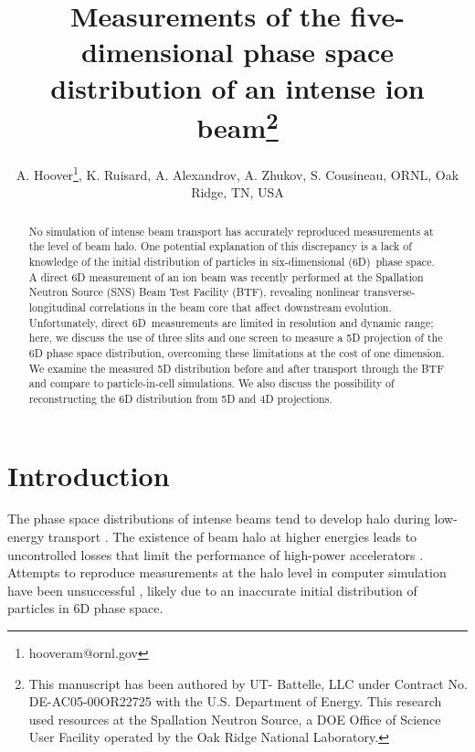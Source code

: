 \documentclass[letterpaper,
               nospread,
               biblatex,
              ]{jacow}
\begin{document}
\title{Measurements of the five-dimensional phase space\\ distribution of an intense ion beam\thanks{This manuscript has been authored by UT- Battelle, LLC under Contract No. DE-AC05-00OR22725 with the U.S. Department of Energy. This research used resources at the Spallation Neutron Source, a DOE Office of Science User Facility operated by the Oak Ridge National Laboratory.}}

\author{A. Hoover\thanks{hooveram@ornl.gov}, K. Ruisard, A. Alexandrov, A. Zhukov, S. Cousineau, ORNL, Oak Ridge, TN, USA}
	
\maketitle

%
\begin{abstract}
No simulation of intense beam transport has accurately reproduced measurements at the level of beam halo. One potential explanation of this discrepancy is a lack of knowledge of the initial distribution of particles in six-dimensional (6D)~phase space. A direct 6D measurement of an ion beam was recently performed at the Spallation Neutron Source (SNS) Beam Test Facility (BTF), revealing nonlinear transverse-longitudinal correlations in the beam core that affect downstream evolution. Unfortunately, direct 6D~measurements are limited in resolution and dynamic range; here, we discuss the use of three slits and one screen to measure a 5D projection of the 6D phase space distribution, overcoming these limitations at the cost of one dimension. We examine the measured 5D distribution before and after transport through the BTF and compare to particle-in-cell simulations. We also discuss the possibility of reconstructing the 6D distribution from 5D and 4D projections.
\end{abstract}

\section{Introduction}

The phase space distributions of intense beams tend to develop halo during low-energy transport \cite{Batygin2021}. The existence of beam halo at higher energies leads to uncontrolled losses that limit the performance of high-power accelerators \cite{Henderson2014}. Attempts to reproduce measurements at the halo level in computer simulation have been unsuccessful \cite{Allen2002, Qiang2002, Groening2008}, likely due to an inaccurate initial distribution of particles in 6D phase space.
\end{document}
